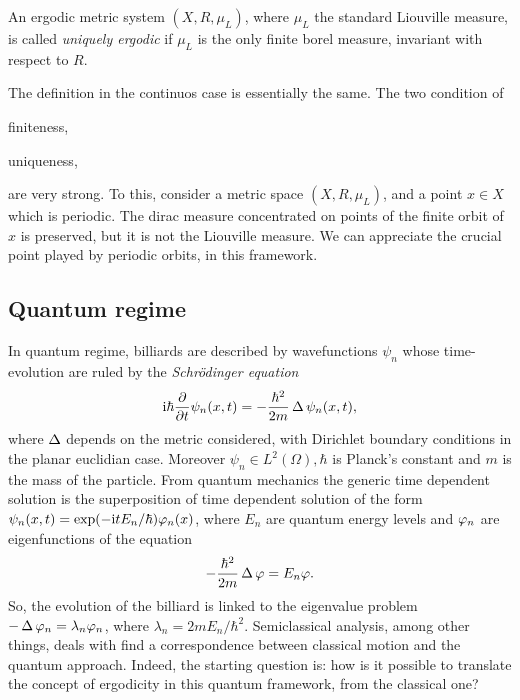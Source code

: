 \begin{defin}
\label{def:unique_ergodic}
An ergodic metric system $(X,R,\mu_{L})$, where $\mu_{L}$ the standard Liouville measure, is called \emph{uniquely ergodic} if $\mu_{L}$ is the only finite borel measure, invariant with respect to $R$.
\end{defin}

The definition in the continuos case is essentially the same. The two condition of
\begin{compactenum}
\item finiteness,
\item uniqueness,
\end{compactenum}
are very strong. To this, consider a metric space $(X,R,\mu_{L})$, and a point $x\in X$ which is periodic. The dirac measure concentrated on points of the finite orbit of $x$ is preserved, but it is not the Liouville measure. We can appreciate the crucial point played by periodic orbits, in this framework.

\subsection{Quantum regime}

In quantum regime, billiards are described by wavefunctions $\psi_{n}$ whose time-evolution are ruled by the \emph{Schr{\"o}dinger equation}
\[
\mathrm{i}\hbar\frac{\partial}{\partial t}\psi_{n}(x,t)=-\frac{\hbar^{2}}{2m}\operatorname{\Delta}\psi_{n}(x,t),
\]
where $\operatorname{\Delta}$ depends on the metric considered, with Dirichlet boundary conditions in the planar euclidian case. Moreover $\psi_{n}\in L^{2}(\Omega),\hbar$ is Planck's constant and $m$ is the mass of the particle. From quantum mechanics the generic time dependent solution is the superposition of time dependent solution of the form $\psi_{n}(x,t)=\exp(-\mathrm{i} t E_{n}/\hbar)\varphi_{n}(x)$, where $E_{n}$ are quantum energy levels and $\varphi_{n}$ are eigenfunctions of the equation 
\[
-\frac{\hbar^{2}}{2m}\operatorname{\Delta}\varphi =E_{n}\varphi.
\]
So, the  evolution of the billiard is linked to the eigenvalue problem $-\operatorname{\Delta}\varphi_{n}=\lambda_{n}\varphi_{n}$, where $\lambda_{n}=2mE_{n}/\hbar^{2}$. Semiclassical analysis, among other things, deals with find a correspondence between classical motion and the quantum approach. Indeed, the starting question is: how is it possible to translate the concept of ergodicity in this quantum framework, from the classical one?

